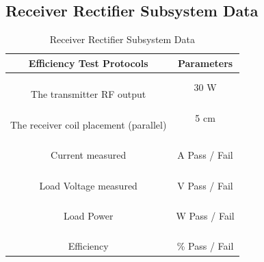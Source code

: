 \documentclass[12pt]{article}
\begin{document}
\subsection{Receiver Rectifier Subsystem Data}

\begin{table}[h!]
\centering
\caption*{Receiver Rectifier Subsystem Data}
\begin{tabular}{ | c | c | }
\hline
\textbf{Efficiency Test Protocols} & \textbf{Parameters} \\
\hline
\parbox{0.5\linewidth}{\raggedright \hfill \\[-0.25 em]
The transmitter RF output
 \hfill \\[0.1 em]} & 
 30 W\\
\hline
\parbox{0.5\linewidth}{\raggedright \hfill \\[-0.25 em]
The receiver coil placement (parallel)
\hfill \\[0.1 em]} & 
5 cm\\
\hline
\parbox{0.5\linewidth}{\raggedright \hfill \\[-0.25 em]
Current measured
\hfill \\[0.1 em]} &  \parbox{0.4\linewidth}{\raggedright \hfill \\ [0.7 em] \underline{\hspace{0.625in}} 
A 
\hspace{0.125 in}Pass \space / \space  Fail \hfill \\ [0.3 em]} \\ 
\hline
\parbox{0.5\linewidth}{\raggedright \hfill \\[-0.25 em]
Load Voltage measured
\hfill \\[0.1 em]} &  \parbox{0.4\linewidth}{\raggedright \hfill \\ [0.7 em]\underline{\hspace{0.625in}} 
V  
\hspace{0.125 in}Pass \space / \space  Fail \hfill \\ [0.3 em]} \\ 
\hline
\parbox{0.5\linewidth}{\raggedright \hfill \\[-0.25 em]
Load Power
\hfill \\[0.1 em]} &  \parbox{0.4\linewidth}{\raggedright \hfill \\ [0.7 em]\underline{\hspace{0.625in}} 
W
\hspace{0.125 in}Pass \space / \space  Fail \hfill \\ [0.3 em]} \\ 
\hline
\parbox{0.5\linewidth}{\raggedright \hfill \\[-0.25 em]
Efficiency
\hfill \\[0.1 em]} &  \parbox{0.4\linewidth}{\raggedright \hfill \\ [0.7 em]\underline{\hspace{0.625in}} 
\%
\hspace{0.125 in}Pass \space / \space  Fail \hfill \\ [0.3 em]} \\ 
\hline
\end{tabular}
\end{table}
\end{document}
